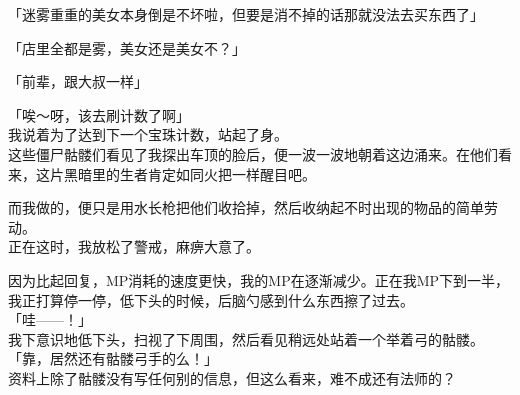 「迷雾重重的美女本身倒是不坏啦，但要是消不掉的话那就没法去买东西了」

「店里全都是雾，美女还是美女不？」

「前辈，跟大叔一样」

「唉～呀，该去刷计数了啊」\\

我说着为了达到下一个宝珠计数，站起了身。\\

这些僵尸骷髅们看见了我探出车顶的脸后，便一波一波地朝着这边涌来。在他们看来，这片黑暗里的生者肯定如同火把一样醒目吧。

而我做的，便只是用水长枪把他们收拾掉，然后收纳起不时出现的物品的简单劳动。\\

正在这时，我放松了警戒，麻痹大意了。

因为比起回复，MP消耗的速度更快，我的MP在逐渐减少。正在我MP下到一半，我正打算停一停，低下头的时候，后脑勺感到什么东西擦了过去。\\

「哇——！」\\

我下意识地低下头，扫视了下周围，然后看见稍远处站着一个举着弓的骷髅。\\

「靠，居然还有骷髅弓手的么！」\\

资料上除了骷髅没有写任何别的信息，但这么看来，难不成还有法师的？

